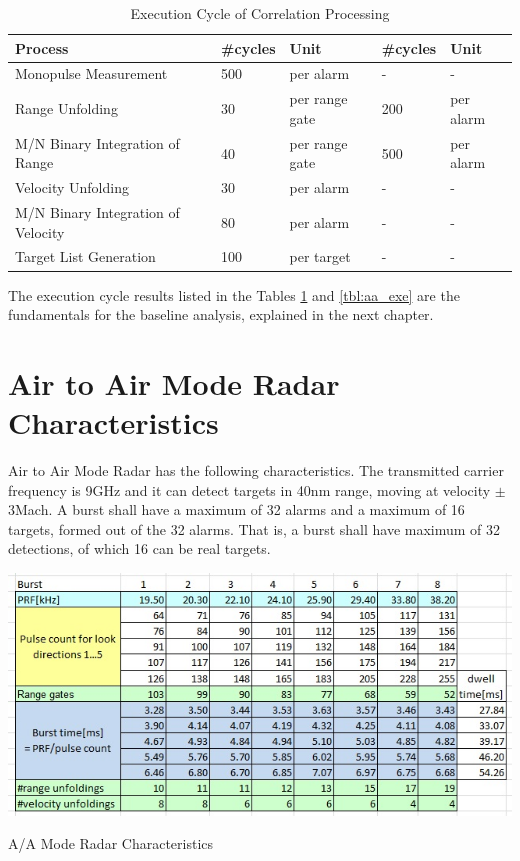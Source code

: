 \begin{table}[h!]
	\centering
	\begin{tabular}{|l|l|l||l|l|} 
	 	\hline
		\textbf{Process} & \textbf{\#cycles} & \textbf{Unit} & \textbf{\#cycles} & \textbf{Unit}  \\ \hline
		Monopulse Measurement & 500 & per alarm & - & - \\ \hline
		Range Unfolding & 30 & per range gate & 200 & per alarm \\ \hline
		M/N Binary Integration of Range & 40 & per range gate & 500 & per alarm \\ \hline
		Velocity Unfolding & 30 & per alarm & - & - \\ \hline
		M/N Binary Integration of Velocity & 80 & per alarm & - & - \\ \hline
		Target List Generation & 100 & per target & - & - \\ \hline
	\end{tabular}
	\caption{Execution Cycle of Correlation Processing \cite{fcas}}
	\label{tbl:rel_work:corr_proc_exe}
\end{table}

The execution cycle results listed in the Tables \ref{tbl:rel_work:corr_proc_exe} and \ref{tbl:aa_exe} are the fundamentals for the baseline analysis, explained in the next chapter.
 
\section{Air to Air Mode Radar Characteristics}
\label{ss:aa_mode:radar_char}
Air to Air Mode Radar has the following characteristics. The transmitted carrier frequency is 9GHz and it can detect targets in 40nm range, moving at velocity $\pm$3Mach. A burst shall have a maximum of 32 alarms and a maximum of 16 targets, formed out of the 32 alarms. That is, a burst shall have maximum of 32 detections, of which 16 can be real targets.

\begin{table}
	\centering
	\includegraphics[width=140mm]{figures/aa_char}
	\caption{A/A Mode Radar Characteristics}
	\label{fig:bg_related_work:aa_char}
\end{table}

